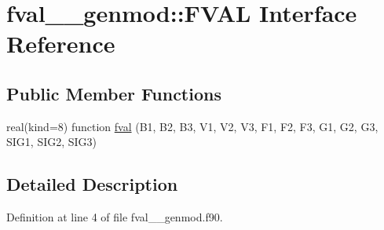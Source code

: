 \hypertarget{interfacefval____genmod_1_1FVAL}{\section{fval\+\_\+\+\_\+genmod\+:\+:F\+V\+A\+L Interface Reference}
\label{interfacefval____genmod_1_1FVAL}
}
\subsection*{Public Member Functions}
\begin{DoxyCompactItemize}
\item 
real(kind=8) function \hyperlink{interfacefval____genmod_1_1FVAL_a0dea7b37fd01b8cdb4161c0d35c4563e}{fval} (B1, B2, B3, V1, V2, V3, F1, F2, F3, G1, G2, G3, S\+I\+G1, S\+I\+G2, S\+I\+G3)
\end{DoxyCompactItemize}


\subsection{Detailed Description}


Definition at line 4 of file fval\+\_\+\+\_\+genmod.\+f90.



